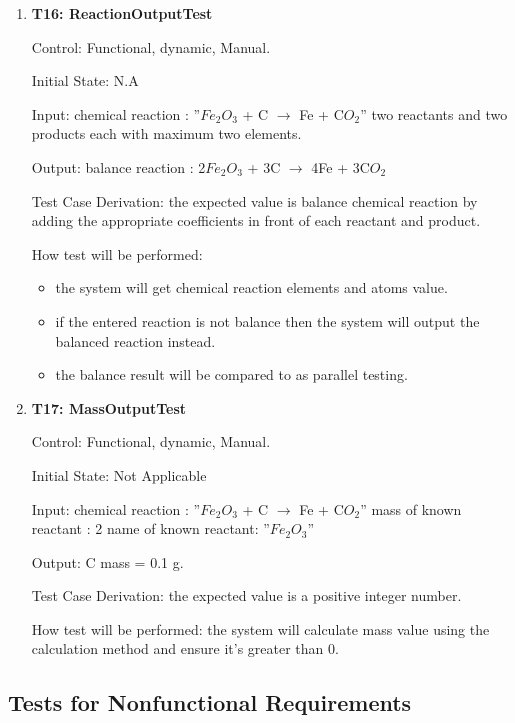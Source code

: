 \documentclass[12pt, titlepage]{article}
\begin{document}
\begin{enumerate}

\item{\bf T16: ReactionOutputTest\\}

Control: Functional, dynamic, Manual.
					
Initial State: N.A
					
Input: 
chemical reaction : ”$Fe_2$$O_3$ + C $\rightarrow$ Fe + C$O_2$”
two reactants and two products each with maximum two elements.
	
Output: balance reaction : 2$Fe_2$$O_3$ + 3C $\rightarrow$ 4Fe + 3C$O_2$

Test Case Derivation: the expected value is balance chemical reaction by adding the appropriate coefficients in front of each reactant and product.

How test will be performed: 
\begin{itemize}
\item the system will get chemical reaction elements and atoms value. 
\item if the entered reaction is not balance then the system will output the balanced reaction instead. 
\item the balance result will be compared to \cite{OnlineBalancer} as parallel testing.
\end{itemize}


\item{\bf T17: MassOutputTest\\}

Control: Functional, dynamic, Manual.
					
Initial State: Not Applicable
					
Input:
\newline
chemical reaction : ”$Fe_2$$O_3$ + C $\rightarrow$ Fe + C$O_2$”
\newline
mass of known reactant : 2
\newline
name of known reactant: ”$Fe_2$$O_3$”
				
Output: C mass = 0.1 g. 

Test Case Derivation: the expected value is a positive integer number. 
					
How test will be performed: 
the system will calculate mass value using the calculation method and ensure it's greater than 0.
 
\end{enumerate}	


\subsection{Tests for Nonfunctional Requirements}
\end{document}
